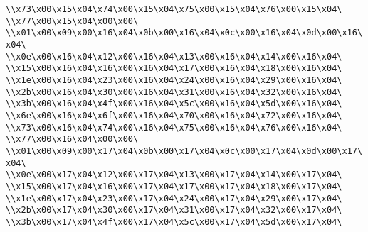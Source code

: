 \verb|\\x73\x00\x15\x04\x74\x00\x15\x04\x75\x00\x15\x04\x76\x00\x15\x04\|\newline
\verb|\\x77\x00\x15\x04\x00\x00\|\newline
\verb|\\x01\x00\x09\x00\x16\x04\x0b\x00\x16\x04\x0c\x00\x16\x04\x0d\x00\x16\x04\|\newline
\verb|\\x0e\x00\x16\x04\x12\x00\x16\x04\x13\x00\x16\x04\x14\x00\x16\x04\|\newline
\verb|\\x15\x00\x16\x04\x16\x00\x16\x04\x17\x00\x16\x04\x18\x00\x16\x04\|\newline
\verb|\\x1e\x00\x16\x04\x23\x00\x16\x04\x24\x00\x16\x04\x29\x00\x16\x04\|\newline
\verb|\\x2b\x00\x16\x04\x30\x00\x16\x04\x31\x00\x16\x04\x32\x00\x16\x04\|\newline
\verb|\\x3b\x00\x16\x04\x4f\x00\x16\x04\x5c\x00\x16\x04\x5d\x00\x16\x04\|\newline
\verb|\\x6e\x00\x16\x04\x6f\x00\x16\x04\x70\x00\x16\x04\x72\x00\x16\x04\|\newline
\verb|\\x73\x00\x16\x04\x74\x00\x16\x04\x75\x00\x16\x04\x76\x00\x16\x04\|\newline
\verb|\\x77\x00\x16\x04\x00\x00\|\newline
\verb|\\x01\x00\x09\x00\x17\x04\x0b\x00\x17\x04\x0c\x00\x17\x04\x0d\x00\x17\x04\|\newline
\verb|\\x0e\x00\x17\x04\x12\x00\x17\x04\x13\x00\x17\x04\x14\x00\x17\x04\|\newline
\verb|\\x15\x00\x17\x04\x16\x00\x17\x04\x17\x00\x17\x04\x18\x00\x17\x04\|\newline
\verb|\\x1e\x00\x17\x04\x23\x00\x17\x04\x24\x00\x17\x04\x29\x00\x17\x04\|\newline
\verb|\\x2b\x00\x17\x04\x30\x00\x17\x04\x31\x00\x17\x04\x32\x00\x17\x04\|\newline
\verb|\\x3b\x00\x17\x04\x4f\x00\x17\x04\x5c\x00\x17\x04\x5d\x00\x17\x04\|\newline

